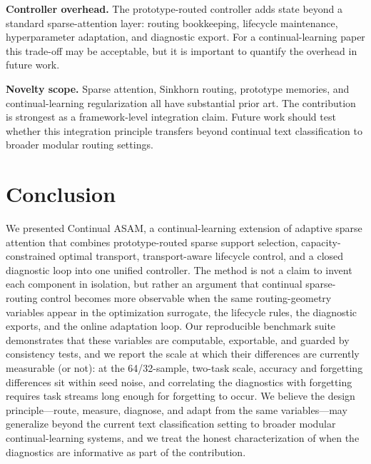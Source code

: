\documentclass[11pt,a4paper]{article}
\theoremstyle{definition}
\begin{document}
\textbf{Controller overhead.} The prototype-routed controller adds state beyond a standard sparse-attention layer: routing bookkeeping, lifecycle maintenance, hyperparameter adaptation, and diagnostic export. For a continual-learning paper this trade-off may be acceptable, but it is important to quantify the overhead in future work.

\textbf{Novelty scope.} Sparse attention, Sinkhorn routing, prototype memories, and continual-learning regularization all have substantial prior art. The contribution is strongest as a framework-level integration claim. Future work should test whether this integration principle transfers beyond continual text classification to broader modular routing settings.

\section{Conclusion}
\label{sec:conclusion}

We presented Continual ASAM, a continual-learning extension of adaptive sparse attention that combines prototype-routed sparse support selection, capacity-constrained optimal transport, transport-aware lifecycle control, and a closed diagnostic loop into one unified controller. The method is not a claim to invent each component in isolation, but rather an argument that continual sparse-routing control becomes more observable when the same routing-geometry variables appear in the optimization surrogate, the lifecycle rules, the diagnostic exports, and the online adaptation loop. Our reproducible benchmark suite demonstrates that these variables are computable, exportable, and guarded by consistency tests, and we report the scale at which their differences are currently measurable (or not): at the 64/32-sample, two-task scale, accuracy and forgetting differences sit within seed noise, and correlating the diagnostics with forgetting requires task streams long enough for forgetting to occur. We believe the design principle---route, measure, diagnose, and adapt from the same variables---may generalize beyond the current text classification setting to broader modular continual-learning systems, and we treat the honest characterization of when the diagnostics are informative as part of the contribution.



\end{document}
